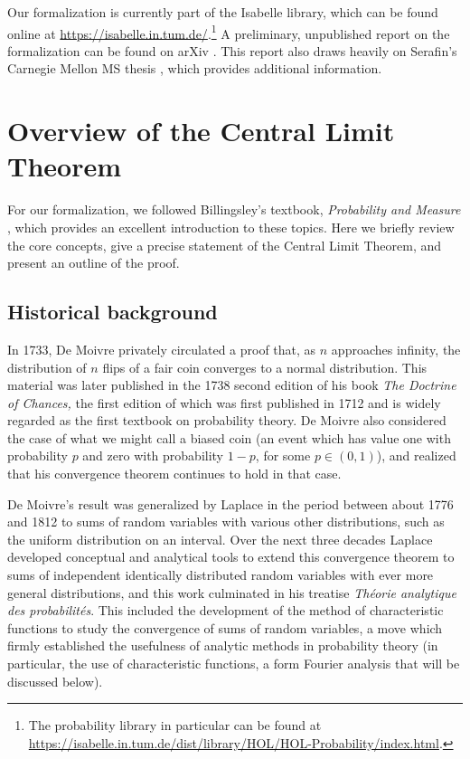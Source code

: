 \documentclass{svjour3}
\begin{document}
Our formalization is currently part of the Isabelle library, which can be found online at \url{https://isabelle.in.tum.de/}.\footnote{The probability library in particular can be found at \url{https://isabelle.in.tum.de/dist/library/HOL/HOL-Probability/index.html}.} A preliminary, unpublished report on the formalization can be found on arXiv \cite{avigad:hoelzl:serafin:14}. This report also draws heavily on Serafin's Carnegie Mellon MS thesis \cite{serafin:15}, which provides additional information.

\section{Overview of the Central Limit Theorem}
\label{section:overview}

For our formalization, we followed Billingsley's textbook, \emph{Probability and Measure} \cite{billingsley:95}, which provides an excellent introduction to these topics. Here we briefly review the core concepts, give a precise statement of the Central Limit Theorem, and present an outline of the proof.

\subsection{Historical background}

In 1733, De Moivre privately circulated a proof that, as $n$ approaches infinity, the distribution of $n$ flips of a fair coin converges to a normal distribution. This material was later published in the 1738 second edition of his book {\em The Doctrine of Chances,} the first edition of which was first published in 1712 and is widely regarded as the first textbook on probability theory. De Moivre also considered the case of what we might call a biased coin (an event which has value one with probability $p$ and zero with probability $1-p$, for some $p \in (0,1)$), and realized that his convergence theorem continues to hold in that case.

De Moivre's result was generalized by Laplace in the period between about 1776 and 1812 to sums of random variables with various other distributions, such as the uniform distribution on an interval. Over the next three decades Laplace developed conceptual and analytical tools to extend this convergence theorem to sums of independent identically distributed random variables with ever more general distributions, and this work culminated in his treatise {\em Th\'eorie analytique des probabilit\'es}. This included the development of the method of characteristic functions to study the convergence of sums of random variables, a move which firmly established the usefulness of analytic methods in probability theory (in particular, the use of characteristic functions, a form Fourier analysis that will be discussed below). 
\end{document}
